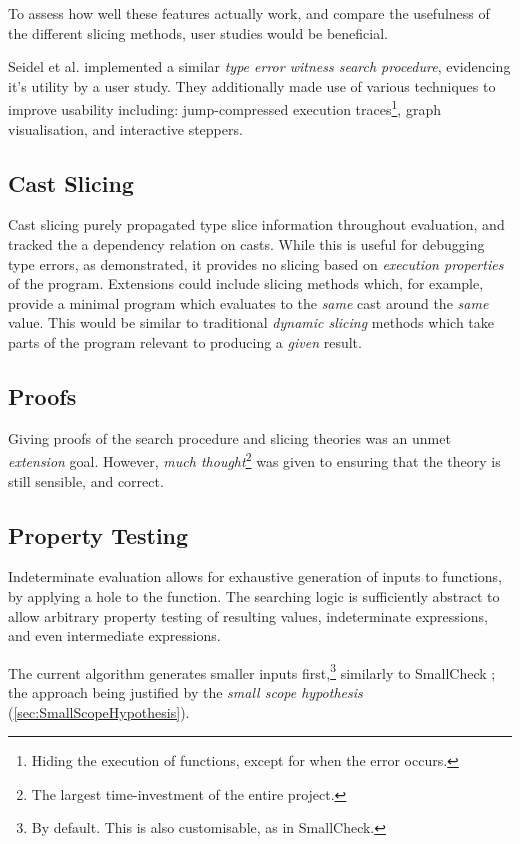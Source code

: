 To assess how well these features actually work, and compare the usefulness of the different slicing methods, user studies would be beneficial.

Seidel et al. \cite{SearchProc} implemented a similar \textit{type error witness search procedure}, evidencing it's utility by a user study. They additionally made use of various techniques to improve usability including: jump-compressed execution traces\footnote{Hiding the execution of functions, except for when the error occurs.}, graph visualisation, and interactive steppers.

\subsection{Cast Slicing}
Cast slicing purely propagated type slice information throughout evaluation, and tracked the a dependency relation on casts. While this is useful for debugging type errors, as demonstrated, it provides no slicing based on \textit{execution properties} of the program. Extensions could include slicing methods which, for example, provide a minimal program which evaluates to the \textit{same} cast around the \textit{same} value. This would be similar to traditional \textit{dynamic slicing} methods \cite{DynProgSlice, FunctionalProgExplain} which take parts of the program relevant to producing a \textit{given} result.


\subsection{Proofs}

Giving proofs of the search procedure and slicing theories was an unmet \textit{extension} goal. However, \textit{much thought}\footnote{The largest time-investment of the entire project.} was given to ensuring that the theory is still sensible, and correct.

\subsection{Property Testing}
Indeterminate evaluation allows for exhaustive generation of inputs to functions, by applying a hole to the function. The searching logic is sufficiently abstract to allow arbitrary property testing of resulting values, indeterminate expressions, and even intermediate expressions.

The current algorithm generates smaller inputs first,\footnote{By default. This is also customisable, as in SmallCheck.} similarly to SmallCheck \cite{SmallCheck}; the approach being justified by the \textit{small scope hypothesis} (\cref{sec:SmallScopeHypothesis}). 

